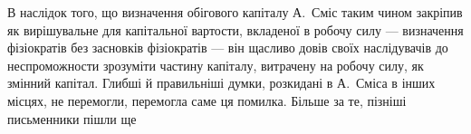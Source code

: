 В наслідок того, що визначення обігового капіталу А.~Сміс таким
чином закріпив як вирішувальне для капітальної вартости, вкладеної в робочу
силу — визначення фізіократів без засновків фізіократів — він щасливо
довів своїх наслідувачів до неспроможности зрозуміти частину капіталу,
витрачену на робочу силу, як змінний капітал. Глибші й правильніші
думки, розкидані в А.~Сміса в інших місцях, не перемогли, перемогла
саме ця помилка. Більше за те, пізніші письменники пішли ще
\parbreak{}  %
